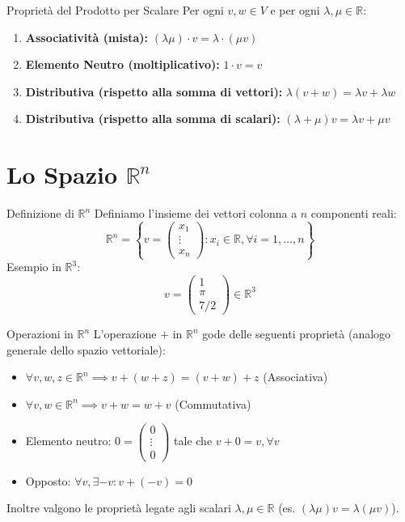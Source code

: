 \begin{proposition}{Proprietà del Prodotto per Scalare}{}
Per ogni $v, w \in V$ e per ogni $\lambda, \mu \in \mathbb{R}$:
\begin{enumerate}[start=5]
    \item \textbf{Associatività (mista):} $(\lambda\mu) \cdot v = \lambda \cdot (\mu v)$
    \item \textbf{Elemento Neutro (moltiplicativo):} $1 \cdot v = v$
    \item \textbf{Distributiva (rispetto alla somma di vettori):} $\lambda(v + w) = \lambda v + \lambda w$
    \item \textbf{Distributiva (rispetto alla somma di scalari):} $(\lambda + \mu)v = \lambda v + \mu v$
\end{enumerate}
\end{proposition}

\section{Lo Spazio $\mathbb{R}^n$}

\begin{concept}{Definizione di $\mathbb{R}^n$}{}
Definiamo l'insieme dei vettori colonna a $n$ componenti reali:
\[
\mathbb{R}^n = \left\{ v = \begin{pmatrix} x_1 \\ \vdots \\ x_n \end{pmatrix} : x_i \in \mathbb{R}, \forall i=1, \dots, n \right\}
\]
Esempio in $\mathbb{R}^3$:
\[
v = \begin{pmatrix} 1 \\ \pi \\ 7/2 \end{pmatrix} \in \mathbb{R}^3
\]
\end{concept}

\begin{proposition}{Operazioni in $\mathbb{R}^n$}{}
L'operazione $+$ in $\mathbb{R}^n$ gode delle seguenti proprietà (analogo generale dello spazio vettoriale):
\begin{itemize}
    \item $\forall v, w, z \in \mathbb{R}^n \implies v + (w + z) = (v + w) + z$ (Associativa)
    \item $\forall v, w \in \mathbb{R}^n \implies v + w = w + v$ (Commutativa)
    \item Elemento neutro: $0 = \begin{pmatrix} 0 \\ \vdots \\ 0 \end{pmatrix}$ tale che $v + 0 = v, \forall v$
    \item Opposto: $\forall v, \exists -v : v + (-v) = 0$
\end{itemize}
Inoltre valgono le proprietà legate agli scalari $\lambda, \mu \in \mathbb{R}$ (es. $(\lambda\mu)v = \lambda(\mu v)$).
\end{proposition}

